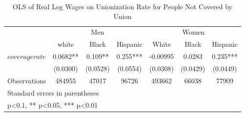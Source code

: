 \begin{table}[htbp]\centering
\def\sym#1{\ifmmode^{#1}\else\(^{#1}\)\fi}
\caption{OLS of Real Log Wages on Unionization Rate for People Not Covered by Union}
\begin{tabular}{l*{6}{c}}
\hline\hline
                    &\multicolumn{3}{c}{Men}                        &\multicolumn{3}{c}{Women}                      \\\cmidrule(lr){2-4}\cmidrule(lr){5-7}
                    &\multicolumn{1}{c}{white}&\multicolumn{1}{c}{Black}&\multicolumn{1}{c}{Hispanic}&\multicolumn{1}{c}{White}&\multicolumn{1}{c}{Black}&\multicolumn{1}{c}{Hispanic}\\
\hline
$ coveragerate $    &      0.0682** &       0.109** &       0.255***&    -0.00995   &      0.0283   &       0.235***\\
                    &    (0.0300)   &    (0.0528)   &    (0.0554)   &    (0.0308)   &    (0.0429)   &    (0.0449)   \\
\hline
Observations        &      484955   &       47017   &       96726   &      493662   &       66038   &       77909   \\
\hline\hline
\multicolumn{7}{l}{\footnotesize Standard errors in parentheses}\\
\multicolumn{7}{l}{\footnotesize * p<0.1, ** p<0.05, *** p<0.01}\\
\end{tabular}
\end{table}

